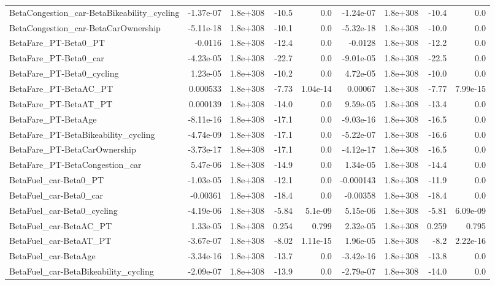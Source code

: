 \begin{tabular}{lrrrrrrrr}
BetaCongestion_car-BetaBikeability_cycling & -1.37e-07 & 1.8e+308 & -10.5 & 0.0 & -1.24e-07 & 1.8e+308 & -10.4 & 0.0 \\
BetaCongestion_car-BetaCarOwnership & -5.11e-18 & 1.8e+308 & -10.1 & 0.0 & -5.32e-18 & 1.8e+308 & -10.0 & 0.0 \\
BetaFare_PT-Beta0_PT & -0.0116 & 1.8e+308 & -12.4 & 0.0 & -0.0128 & 1.8e+308 & -12.2 & 0.0 \\
BetaFare_PT-Beta0_car & -4.23e-05 & 1.8e+308 & -22.7 & 0.0 & -9.01e-05 & 1.8e+308 & -22.5 & 0.0 \\
BetaFare_PT-Beta0_cycling & 1.23e-05 & 1.8e+308 & -10.2 & 0.0 & 4.72e-05 & 1.8e+308 & -10.0 & 0.0 \\
BetaFare_PT-BetaAC_PT & 0.000533 & 1.8e+308 & -7.73 & 1.04e-14 & 0.00067 & 1.8e+308 & -7.77 & 7.99e-15 \\
BetaFare_PT-BetaAT_PT & 0.000139 & 1.8e+308 & -14.0 & 0.0 & 9.59e-05 & 1.8e+308 & -13.4 & 0.0 \\
BetaFare_PT-BetaAge & -8.11e-16 & 1.8e+308 & -17.1 & 0.0 & -9.03e-16 & 1.8e+308 & -16.5 & 0.0 \\
BetaFare_PT-BetaBikeability_cycling & -4.74e-09 & 1.8e+308 & -17.1 & 0.0 & -5.22e-07 & 1.8e+308 & -16.6 & 0.0 \\
BetaFare_PT-BetaCarOwnership & -3.73e-17 & 1.8e+308 & -17.1 & 0.0 & -4.12e-17 & 1.8e+308 & -16.5 & 0.0 \\
BetaFare_PT-BetaCongestion_car & 5.47e-06 & 1.8e+308 & -14.9 & 0.0 & 1.34e-05 & 1.8e+308 & -14.4 & 0.0 \\
BetaFuel_car-Beta0_PT & -1.03e-05 & 1.8e+308 & -12.1 & 0.0 & -0.000143 & 1.8e+308 & -11.9 & 0.0 \\
BetaFuel_car-Beta0_car & -0.00361 & 1.8e+308 & -18.4 & 0.0 & -0.00358 & 1.8e+308 & -18.4 & 0.0 \\
BetaFuel_car-Beta0_cycling & -4.19e-06 & 1.8e+308 & -5.84 & 5.1e-09 & 5.15e-06 & 1.8e+308 & -5.81 & 6.09e-09 \\
BetaFuel_car-BetaAC_PT & 1.33e-05 & 1.8e+308 & 0.254 & 0.799 & 2.32e-05 & 1.8e+308 & 0.259 & 0.795 \\
BetaFuel_car-BetaAT_PT & -3.67e-07 & 1.8e+308 & -8.02 & 1.11e-15 & 1.96e-05 & 1.8e+308 & -8.2 & 2.22e-16 \\
BetaFuel_car-BetaAge & -3.34e-16 & 1.8e+308 & -13.7 & 0.0 & -3.42e-16 & 1.8e+308 & -13.8 & 0.0 \\
BetaFuel_car-BetaBikeability_cycling & -2.09e-07 & 1.8e+308 & -13.9 & 0.0 & -2.79e-07 & 1.8e+308 & -14.0 & 0.0 \\

\end{tabular}
